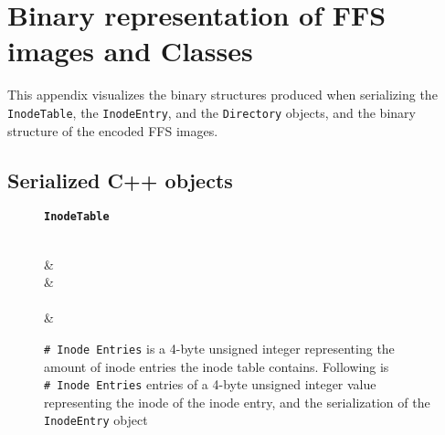 \renewcommand{\chaptermark}[1]{\markboth{Appendix \thechapter\relax:\thinspace\relax#1}{}}
\chapter{Binary representation of FFS images and Classes}
\label{app:binary_rep}
This appendix visualizes the binary structures produced when serializing the \texttt{InodeTable}, the \texttt{InodeEntry}, and the \texttt{Directory} objects, and the binary structure of the encoded FFS images.

\section{Serialized C++ objects}
\begin{figure}[!ht]
	\centering
    \textbf{\texttt{InodeTable}}\par\medskip

	\begin{bytefield}[bitwidth=0.0625\textwidth,endianness=big]{16}
		\\
		 &  \\
		 &  \\
		 \\[1ex]
		 &  \\
	\end{bytefield}
	\caption[Binary representation of the serialization of a \texttt{InodeTable} object]{\texttt{\#~Inode Entries} is a 4-byte unsigned integer representing the amount of inode entries the inode table contains. Following is \texttt{\#~Inode Entries} entries of a 4-byte unsigned integer value representing the inode of the inode entry, and the serialization of the \texttt{InodeEntry} object}
\end{figure}

